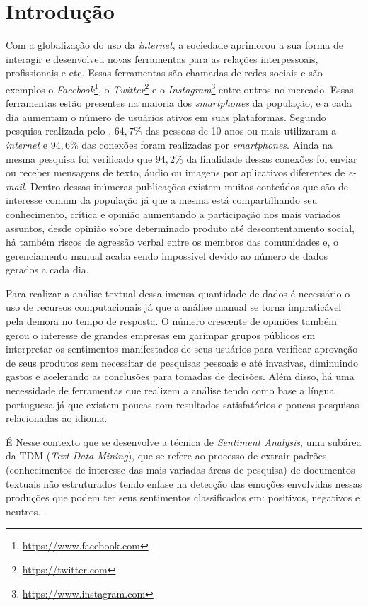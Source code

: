 \chapter{Introdução}
\label{cap:Introducao}
Com a globalização do uso da \textit{internet}, a sociedade aprimorou a sua forma de interagir e desenvolveu novas ferramentas para as relações interpessoais, profissionais e etc. Essas ferramentas são chamadas de redes sociais e são exemplos o \textit{Facebook}\footnote{\url{https://www.facebook.com}}, o \textit{Twitter}\footnote{\url{https://twitter.com}} e o \textit{Instagram}\footnote{\url{https://www.instagram.com}} entre outros no mercado. Essas ferramentas estão presentes na maioria dos \textit{smartphones} da população, e a cada dia aumentam o número de usuários ativos em suas plataformas. Segundo pesquisa realizada pelo , $64,7\%$ das pessoas de 10 anos ou mais utilizaram a \textit{internet} e $94,6\%$ das conexões foram realizadas por \textit{smartphones}. Ainda na mesma pesquisa foi verificado que $94,2\%$ da finalidade dessas conexões foi enviar ou receber mensagens de texto, áudio ou imagens por aplicativos diferentes de \textit{e-mail}. Dentro dessas inúmeras publicações existem muitos conteúdos que são de interesse comum da população já que a mesma está compartilhando seu conhecimento, crítica e opinião aumentando a participação nos mais variados assuntos, desde opinião sobre determinado produto até descontentamento social, há também riscos de agressão verbal entre os membros das comunidades e, o gerenciamento manual acaba sendo impossível devido ao número de dados gerados a cada dia.

Para realizar a análise textual dessa imensa quantidade de dados é necessário o uso de recursos computacionais já que a análise manual se torna impraticável  pela demora no tempo de resposta. O número crescente de opiniões também gerou o interesse de grandes empresas em garimpar grupos públicos em interpretar os sentimentos manifestados de seus usuários para verificar aprovação de seus produtos sem necessitar de pesquisas pessoais e até invasivas, diminuindo gastos e acelerando as conclusões para tomadas de decisões. Além disso, há uma necessidade de ferramentas que realizem a análise tendo como base a língua portuguesa já que existem poucas com resultados satisfatórios e poucas pesquisas relacionadas ao idioma.

É Nesse contexto que se desenvolve a técnica de \textit{Sentiment Analysis}, uma subárea da TDM (\textit{Text Data Mining})\cite{Hearst:1999:UTD:1034678.1034679}, que se refere ao processo de extrair padrões (conhecimentos de interesse das mais variadas áreas de pesquisa) de documentos textuais não estruturados tendo enfase na detecção das emoções envolvidas nessas produções que podem ter seus sentimentos classificados em: positivos, negativos e neutros. \cite{Li:2010:SAG:2898607.2898826}. 

